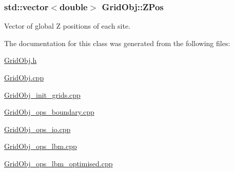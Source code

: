 \subsubsection[{\texorpdfstring{Z\+Pos}{ZPos}}]{\setlength{\rightskip}{0pt plus 5cm}std\+::vector$<$double$>$ Grid\+Obj\+::\+Z\+Pos}\hypertarget{class_grid_obj_af859d35bf0a03cee8965ce3e22e651c6}{}\label{class_grid_obj_af859d35bf0a03cee8965ce3e22e651c6}


Vector of global Z positions of each site. 



The documentation for this class was generated from the following files\+:\begin{DoxyCompactItemize}
\item 
\hyperlink{_grid_obj_8h}{Grid\+Obj.\+h}\item 
\hyperlink{_grid_obj_8cpp}{Grid\+Obj.\+cpp}\item 
\hyperlink{_grid_obj__init__grids_8cpp}{Grid\+Obj\+\_\+init\+\_\+grids.\+cpp}\item 
\hyperlink{_grid_obj__ops__boundary_8cpp}{Grid\+Obj\+\_\+ops\+\_\+boundary.\+cpp}\item 
\hyperlink{_grid_obj__ops__io_8cpp}{Grid\+Obj\+\_\+ops\+\_\+io.\+cpp}\item 
\hyperlink{_grid_obj__ops__lbm_8cpp}{Grid\+Obj\+\_\+ops\+\_\+lbm.\+cpp}\item 
\hyperlink{_grid_obj__ops__lbm__optimised_8cpp}{Grid\+Obj\+\_\+ops\+\_\+lbm\+\_\+optimised.\+cpp}\end{DoxyCompactItemize}
